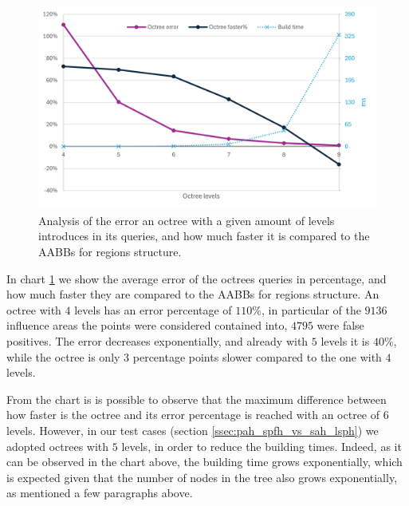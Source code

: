\documentclass{PoliMi_MasterThesis}
\begin{document}
\begin{figure}[H] 
	\centering
	\includegraphics[width=\textwidth]{Images/octree_error_faster_chart.png}
	\caption{Analysis of the error an octree with a given amount of levels introduces in its queries, and how much faster it is compared to the AABBs for regions structure.}
	\label{fig:octree_error_faster_chart}
\end{figure}

In chart \ref{fig:octree_error_faster_chart} we show the average error of the octrees queries in percentage, and how much faster they are compared to the AABBs for regions structure. An octree with $4$ levels has an error percentage of $110\%$, in particular of the $9136$ influence areas the points were considered contained into, $4795$ were false positives. The error decreases exponentially, and already with $5$ levels it is $40\%$, while the octree is only $3$ percentage points slower compared to the one with $4$ levels.

From the chart is is possible to observe that the maximum difference between how faster is the octree and its error percentage is reached with an octree of $6$ levels. However, in our test cases (section \ref{ssec:pah_spfh_vs_sah_lsph}) we adopted octrees with $5$ levels, in order to reduce the building times. Indeed, as it can be observed in the chart above, the building time grows exponentially, which is expected given that the number of nodes in the tree also grows exponentially, as mentioned a few paragraphs above.
\end{document}
